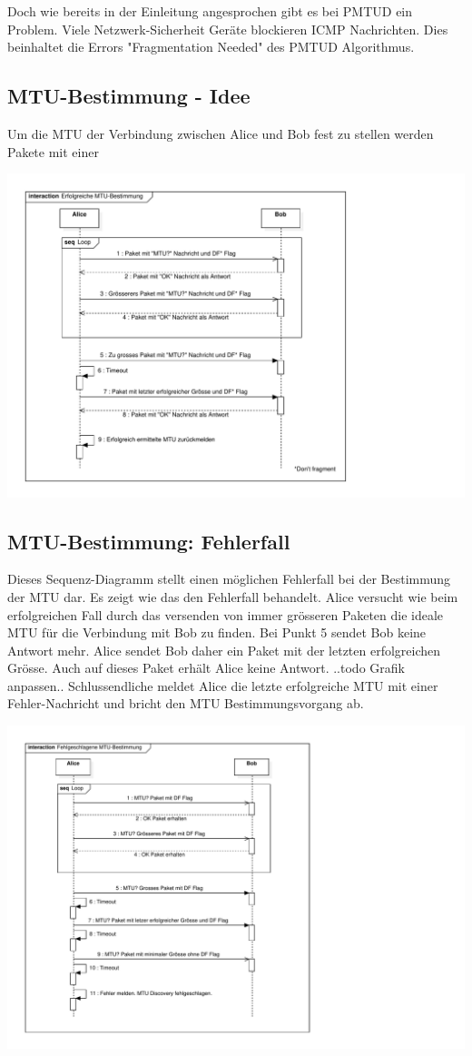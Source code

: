 Doch wie bereits in der Einleitung angesprochen gibt es bei \acs{PMTUD} ein Problem. Viele Netzwerk-Sicherheit Geräte blockieren \acs{ICMP} Nachrichten. Dies beinhaltet die Errors "Fragmentation Needed" des \acs{PMTUD} Algorithmus. 


\subsection{MTU-Bestimmung - Idee}
Um die \acs{MTU} der Verbindung zwischen Alice und Bob fest zu stellen werden Pakete mit einer 

\includegraphics[trim=10 10 200 10,clip,width=\textwidth]{mainpart/implementation/img/MTUBestimmungErfolgreich}

\subsection{MTU-Bestimmung: Fehlerfall}
Dieses Sequenz-Diagramm stellt einen möglichen Fehlerfall bei der Bestimmung der MTU dar. Es zeigt wie das \tool den Fehlerfall behandelt. Alice versucht wie beim erfolgreichen Fall durch das versenden von immer grösseren Paketen die ideale MTU für die Verbindung mit Bob zu finden. Bei Punkt 5 sendet Bob keine Antwort mehr. Alice sendet Bob daher ein Paket mit der letzten erfolgreichen Grösse. Auch auf dieses Paket erhält Alice keine Antwort.  ..todo Grafik anpassen..
Schlussendliche meldet Alice die letzte erfolgreiche MTU mit einer Fehler-Nachricht und bricht den MTU Bestimmungsvorgang ab.

\includegraphics[trim=10 10 265 10,clip,width=\textwidth]{mainpart/implementation/img/MTUBestimmungFehlerfall}